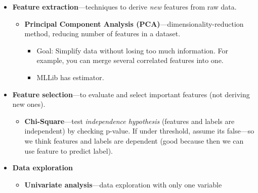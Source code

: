 \begin{multicols}{2}
\begin{itemize}
\begin{itemize}
\begin{itemize}
\begin{itemize}
        \begin{itemize}
                \item
          It\textquotesingle s a blackbox representation, so
          representation rule isn\textquotesingle t deterministic, but
          has superior performance in many NLP tasks.
        \item
          Using w2v, a neural net will be trained on the dataset.
        \item
          MLLib provides estimator for this (fit then transform).
        \end{itemize}
      \end{itemize}
    \end{itemize}
  \end{itemize}
\item
  \textbf{Feature extraction}---techniques to derive \emph{new} features
  from raw data.

  \begin{itemize}
    \item
    \textbf{Principal Component Analysis
    (PCA)}---dimensionality-reduction method, reducing number of
    features in a dataset.

    \begin{itemize}
        \item
      Goal: Simplify data without losing too much information. For
      example, you can merge several correlated features into one.
    \item
      MLLib has estimator.
    \end{itemize}
  \end{itemize}
\item
  \textbf{Feature selection}---to evaluate and select important features
  (not deriving new ones).

  \begin{itemize}
    \item
    \textbf{Chi-Square}---test \emph{independence hypothesis} (features
    and labels are independent) by checking p-value. If under threshold,
    assume it\textquotesingle s false---so we think features and labels
    are dependent (good because then we can use feature to predict
    label).
  \end{itemize}
\item
  \textbf{Data exploration}

  \begin{itemize}
    \item
    \textbf{Univariate analysis}---data exploration with only one
    variable


\end{itemize}
\end{itemize}
\end{multicols}
